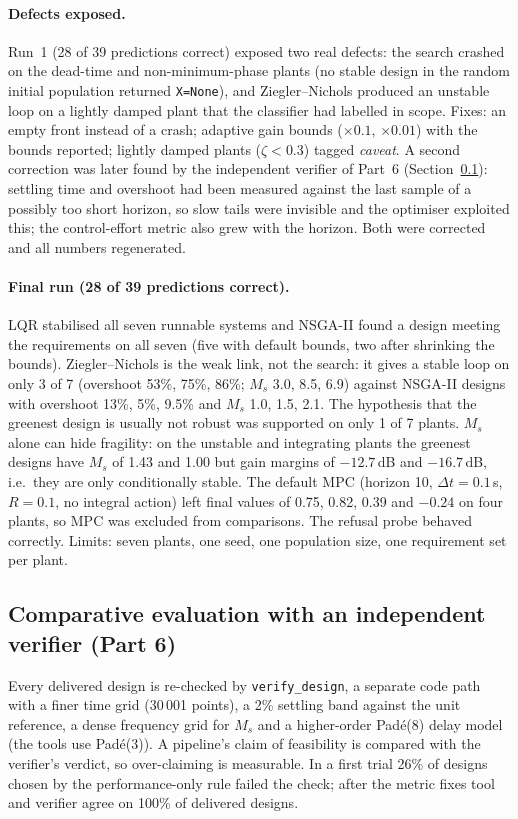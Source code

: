 \documentclass[a4paper,11pt]{article}
\begin{document}
\paragraph{Defects exposed.} Run~1 (28 of 39 predictions correct) exposed two real defects: the search crashed on the dead-time and non-minimum-phase plants (no stable design in the random initial population returned \texttt{X=None}), and Ziegler--Nichols produced an unstable loop on a lightly damped plant that the classifier had labelled in scope. Fixes: an empty front instead of a crash; adaptive gain bounds ($\times0.1$, $\times0.01$) with the bounds reported; lightly damped plants ($\zeta<0.3$) tagged \emph{caveat}. A second correction was later found by the independent verifier of Part~6 (Section~\ref{sec:comp}): settling time and overshoot had been measured against the last sample of a possibly too short horizon, so slow tails were invisible and the optimiser exploited this; the control-effort metric also grew with the horizon. Both were corrected and all numbers regenerated.

\paragraph{Final run (28 of 39 predictions correct).}
LQR stabilised all seven runnable systems and NSGA-II found a design meeting the requirements on all seven (five with default bounds, two after shrinking the bounds). Ziegler--Nichols is the weak link, not the search: it gives a stable loop on only 3 of 7 (overshoot 53\%, 75\%, 86\%; $M_s$ 3.0, 8.5, 6.9) against NSGA-II designs with overshoot 13\%, 5\%, 9.5\% and $M_s$ 1.0, 1.5, 2.1. The hypothesis that the greenest design is usually not robust was supported on only 1 of 7 plants. $M_s$ alone can hide fragility: on the unstable and integrating plants the greenest designs have $M_s$ of 1.43 and 1.00 but gain margins of $-12.7$\,dB and $-16.7$\,dB, i.e.\ they are only conditionally stable. The default MPC (horizon 10, $\Delta t=0.1$\,s, $R=0.1$, no integral action) left final values of 0.75, 0.82, 0.39 and $-0.24$ on four plants, so MPC was excluded from comparisons. The refusal probe behaved correctly. Limits: seven plants, one seed, one population size, one requirement set per plant.

\subsection{Comparative evaluation with an independent verifier (Part 6)}\label{sec:comp}
Every delivered design is re-checked by \texttt{verify\_design}, a separate code path with a finer time grid (30\,001 points), a 2\% settling band against the unit reference, a dense frequency grid for $M_s$ and a higher-order Pad\'e(8) delay model (the tools use Pad\'e(3)). A pipeline's claim of feasibility is compared with the verifier's verdict, so over-claiming is measurable. In a first trial 26\% of designs chosen by the performance-only rule failed the check; after the metric fixes tool and verifier agree on 100\% of delivered designs.
\end{document}
